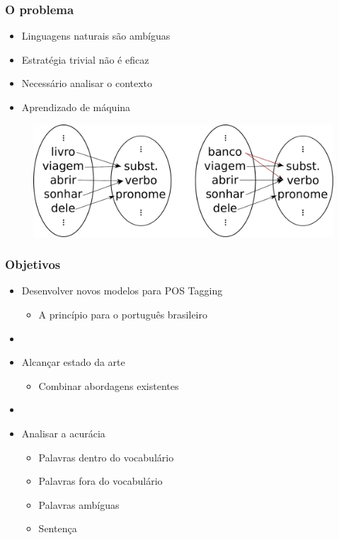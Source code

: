 \documentclass[10pt]{beamer}
\begin{document}
\begin{frame}[fragile]
  \frametitle{O problema}

  

 \begin{itemize}
      \item Linguagens naturais são ambíguas 
      \item Estratégia trivial não é eficaz
      \item Necessário analisar o contexto
      \item Aprendizado de máquina
    \end{itemize}

  
    \begin{figure}[htb]
    \begin{center}
        \includegraphics[scale=0.35]{img/funcoes.pdf}
    \end{center}
  \end{figure}

\end{frame}



\begin{frame}[fragile]
  \frametitle{Objetivos}


 \begin{itemize}
    \item Desenvolver novos modelos para POS Tagging
    \begin{itemize}
      \item[-] A princípio para o português brasileiro
    \end{itemize}
    \item[\ ] \ 
    \item Alcançar estado da arte
    \begin{itemize}
      \item[-] Combinar abordagens existentes
    \end{itemize}
     \item[\ ] \ 
    \item Analisar a acurácia
    \begin{itemize}
      \item[-] Palavras dentro do vocabulário
      \item[-] Palavras fora do vocabulário
      \item[-] Palavras ambíguas
      \item[-] Sentença
    \end{itemize}
  \end{itemize}

\end{frame}
\end{document}

